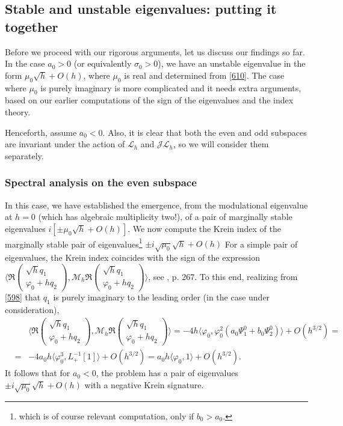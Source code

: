 \documentclass[12pt]{amsart}
\theoremstyle{definition}
\theoremstyle{remark}
\numberwithin{equation}{section}
\renewcommand{\(}{\left(}
\renewcommand{\)}{\right)}
\renewcommand{\[}{\left[}
\renewcommand{\]}{\right]}
\newcommand{\cl}{{\mathcal L}}
\newcommand{\si}{\sigma}
\newcommand{\vp}{\varphi}
\newcommand{\dpr}[2]{\langle #1,#2 \rangle}
\newcommand{\cm}{\mathcal M}
\newcommand{\cj}{{\mathcal J}}
\begin{document}
\subsection{Stable and unstable eigenvalues: putting it together }
Before we proceed with our rigorous arguments, let us discuss our findings so far. In the case
$a_0>0$ (or equivalently $\si_0>0$), we have an unstable eigenvalue in the form $\mu_0 \sqrt{h}+O(h)$, where $\mu_0$ is real and
determined from \eqref{610}. The case where $\mu_0$ is purely imaginary
 is more complicated and it needs extra arguments, based on our earlier computations of the sign of the eigenvalues and the index theory.

 Henceforth,  assume $a_0<0$. Also, it is clear that both the even and odd subspaces are invariant under the action of $\cl_h$ and $\cj \cl_h$, so we will consider them separately.
 \subsubsection{Spectral analysis on the even subspace}  In this case, we have established the emergence,
  from the modulational eigenvalue at $h=0$ (which has algebraic multiplicity two!),  of  a pair of marginally stable eigenvalues
  $i [\pm \mu_0  \sqrt{h}+O(h)]$.
  We now compute the Krein index of  the marginally stable pair  of eigenvalues\footnote{which is of course relevant computation, only if $b_0>a_0$.} $ \pm i \sqrt{\mu_0} \sqrt{h} +O(h)$    For a simple pair of eigenvalues, the Krein index coincides with the sign of the expression
  $\dpr{  \Re \left(\begin{array}{c}
  \sqrt{h} q_1  \\ \vp_0+h q_2
  \end{array}\right)}{ \cm_h \Re \left(\begin{array}{c}
  	\sqrt{h} q_1  \\ \vp_0+h q_2
  	\end{array}\right)}$, see \cite{KKS}, p. 267. To this end,  realizing from \eqref{598} that $q_1$ is purely imaginary to the leading order (in the case under consideration),
  \begin{eqnarray*}
  & &  \dpr{  \Re \left(\begin{array}{c}
   		\sqrt{h} q_1  \\ \vp_0+h q_2
   	\end{array}\right)}{ \cm_h \Re \left(\begin{array}{c}
   	\sqrt{h} q_1  \\ \vp_0+h q_2
   \end{array}\right)}  =   -4h \dpr{\vp_0}{\vp_0^2(a_0 \Psi_1^0+b_0\Psi_2^0)}+O(h^{3/2})= \\
  &=&
-4 a_0 h \dpr{\vp_0^3}{L_+^{-1}[1]}+O(h^{3/2})= a_0 h  \dpr{\vp_0}{1}+O(h^{3/2}).
\end{eqnarray*}
  It follows that for $a_0<0$,  the problem has a pair of eigenvalues $ \pm i \sqrt{\mu_0} \sqrt{h} +O(h)$  with a negative Krein signature.
\end{document}
